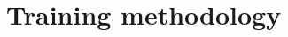 \documentclass [11pt, proquest] {uwthesis}[2020/02/24]
\begin{document}




\section{Training methodology} \label{sec:datasets}
\end{document}
